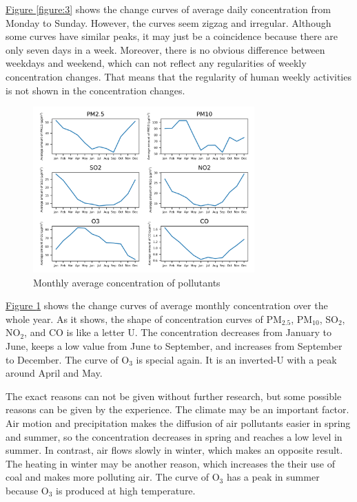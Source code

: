 \documentclass[letterpaper]{article}
\begin{document}
\begin{CJK*}{UTF8}{gkai}
\hyperref[figure:3]{Figure \ref*{figure:3}} shows the change curves of average daily concentration from Monday to Sunday. However, the curves seem zigzag and irregular. Although some curves have similar peaks, it may just be a coincidence because there are only seven days in a week. Moreover, there is no obvious difference between weekdays and weekend, which can not reflect any regularities of weekly concentration changes. That means that the regularity of human weekly activities is not shown in the concentration changes.

\begin{figure}[h]
  \includegraphics[width = 8.5cm]{monavg_pltn.png}
  \caption{Monthly average concentration of pollutants}
  \label{figure:4}
\end{figure}

\hyperref[figure:4]{Figure \ref*{figure:4}} shows the change curves of average monthly concentration over the whole year. As it shows, the shape of concentration curves of PM$_{2.5}$, PM$_{10}$, SO$_{2}$, NO$_{2}$, and CO is like a letter U. The concentration decreases from January to June, keeps a low value from June to September, and increases from September to December. The curve of O$_{3}$ is special again. It is an inverted-U with a peak around April and May.

The exact reasons can not be given without further research, but some possible reasons can be given by the experience. The climate may be an important factor. Air motion and precipitation makes the diffusion of air pollutants easier in spring and summer, so the concentration decreases in spring and reaches a low level in summer. In contrast, air flows slowly in winter, which makes an opposite result. The heating in winter may be another reason, which increases the their use of coal and makes more polluting air. The curve of O$_{3}$ has a peak in summer because O$_{3}$ is produced at high temperature.


\end{CJK*}
\end{document}
